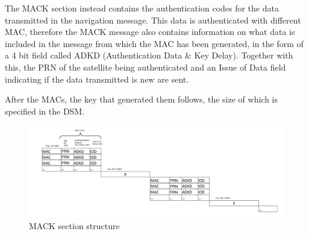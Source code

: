 The MACK section instead contains the authentication codes for the data
transmitted in the navigation message. This data is authenticated with different
MAC, therefore the MACK message also contains information on what data is
included in the message from which the MAC has been generated, in the form of a
4 bit field called ADKD (Authentication Data \& Key Delay). Together with this,
the PRN of the satellite being authenticated and an Issue of Data field
indicating if the data transmitted is new are sent.

After the MACs, the key that generated them follows, the size of which is
specified in the DSM.

\begin{figure}[h!]
  \includegraphics[width=\linewidth]{figures/mack.png}
  \caption{MACK section structure}
  \label{fig:dsm_kroot}
\end{figure}

